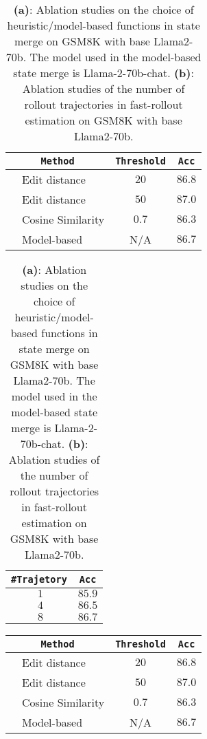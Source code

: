 \documentclass{article}
\begin{document}
\begin{table}[h]
\small
\centering
\begin{minipage}{.45\linewidth}
\centering

    \begin{tabular}{cl|c|c}
    \toprule
        \multicolumn{2}{c|}{\texttt{Method}}         & \texttt{Threshold}  & \texttt{Acc}\\
        \midrule
           &   Edit distance	               & $20$ & $86.8$ \\
           &   Edit distance	             & $50$ & $87.0$\\
           &  Cosine Similarity	            & $0.7$ & $86.3$\\
           & Model-based	& N/A	& $86.7$ \\
        \bottomrule
    \end{tabular}
\vspace{2mm}
\caption*{(a) Ablation on the choice of state merge functions.}
\end{minipage}%
\begin{minipage}{.55\linewidth}
\centering

    \begin{tabular}{cl|c}
    \toprule
        \multicolumn{2}{c|}{\texttt{\#Trajetory}}         & \texttt{Acc}\\
        \midrule
           &   $1$	                & $85.9$ \\
           &   $4$	           & $86.5$\\
           &  $8$	       & $86.7$\\
        \bottomrule
    \end{tabular}
\vspace{2mm}
\caption*{(b) Ablation on the number of trajectories.}
\end{minipage}
\caption{\textbf{(a)}: Ablation studies on the choice of heuristic/model-based functions in state merge on GSM8K with base Llama2-70b. The model used in the model-based state merge is Llama-2-70b-chat. \textbf{(b)}: Ablation studies of the number of rollout trajectories in fast-rollout estimation on GSM8K with base Llama2-70b.}
\label{table:ablation_sm}
\end{table}


\begin{tabular}{cl|c|c}
\toprule
    \multicolumn{2}{c|}{\texttt{Method}}         & \texttt{Threshold}  & \texttt{Acc}\\
    \midrule
        &   Edit distance	               & $20$ & $86.8$ \\
        &   Edit distance	             & $50$ & $87.0$\\
        &  Cosine Similarity	            & $0.7$ & $86.3$\\
        & Model-based	& N/A	& $86.7$ \\
    \bottomrule
\end{tabular}
\end{document}
